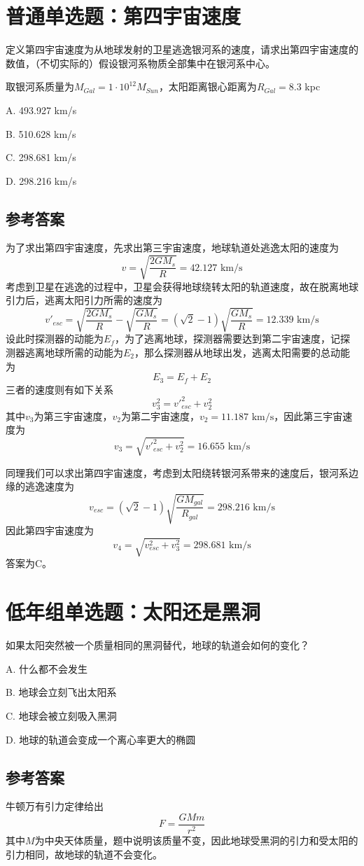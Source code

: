 \documentclass[UTF8]{ctexart}
\numberwithin{equation}{section}
\begin{document}
\newpage
\section{普通单选题：第四宇宙速度}
定义第四宇宙速度为从地球发射的卫星逃逸银河系的速度，请求出第四宇宙速度的数值，（不切实际的）假设银河系物质全部集中在银河系中心。

取银河系质量为$M_{Gal} = 1\cdot 10^{12}M_{Sun}$，太阳距离银心距离为$R_{Gal} = 8.3$ kpc

A. 493.927 km/s 

B. 510.628 km/s 

C. 298.681 km/s 

D. 298.216 km/s

\subsection{参考答案}
为了求出第四宇宙速度，先求出第三宇宙速度，地球轨道处逃逸太阳的速度为
\[
v = \sqrt{\frac{2GM_{s}}{R}} = 42.127 \text{ km/s}
\]
考虑到卫星在逃逸的过程中，卫星会获得地球绕转太阳的轨道速度，故在脱离地球引力后，逃离太阳引力所需的速度为
\[
v'_{esc} = \sqrt{\frac{2GM_s}{R}} - \sqrt{\frac{GM_s}{R}} = (\sqrt{2}-1)\sqrt{\frac{GM_s}{R}} = 12.339 \text{ km/s}
\] 
设此时探测器的动能为$E_f$，为了逃离地球，探测器需要达到第二宇宙速度，记探测器逃离地球所需的动能为$E_2$，那么探测器从地球出发，逃离太阳需要的总动能为
\[
E_3 = E_f+E_2
\]
三者的速度则有如下关系
\[
v_3^2 = v'^2_{esc} + v_2^2
\]
其中$v_3$为第三宇宙速度，$v_2$为第二宇宙速度，$v_2 = 11.187 \text{ km/s}$，因此第三宇宙速度为
\[
v_3 = \sqrt{v'^2_{esc} + v_2^2} = 16.655 \text{ km/s}
\]

同理我们可以求出第四宇宙速度，考虑到太阳绕转银河系带来的速度后，银河系边缘的逃逸速度为
\[
v_{esc} = \left(\sqrt{2}-1\right)\sqrt{\frac{GM_{gal}}{R_{gal}}} = 298.216 \text{ km/s}
\]
因此第四宇宙速度为
\[
v_4 = \sqrt{v^2_{esc} + v_3^2} = 298.681 \text{ km/s}
\]
答案为C。

\newpage
\section{低年组单选题：太阳还是黑洞}
如果太阳突然被一个质量相同的黑洞替代，地球的轨道会如何的变化？

A. 什么都不会发生

B. 地球会立刻飞出太阳系

C. 地球会被立刻吸入黑洞

D. 地球的轨道会变成一个离心率更大的椭圆

\subsection{参考答案}
牛顿万有引力定律给出
\[
F = \frac{GMm}{r^2}
\]
其中$M$为中央天体质量，题中说明该质量不变，因此地球受黑洞的引力和受太阳的引力相同，故地球的轨道不会变化。
\end{document}
